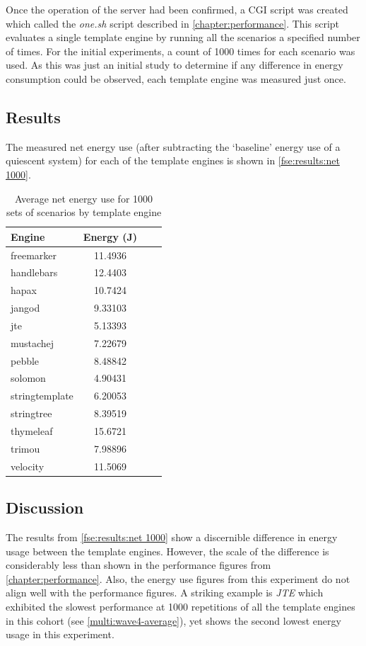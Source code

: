 Once the operation of the server had been confirmed, a CGI script was created which called the \emph{one.sh} script described in \autoref{chapter:performance}. This script evaluates a single template engine by running all the scenarios a specified number of times. For the initial experiments, a count of 1000 times for each scenario was used. As this was just an initial study to determine if any difference in energy consumption could be observed, each template engine was measured just once.

\subsection{Results}
\label{fse results}

The measured net energy use (after subtracting the `baseline' energy use of a quiescent system) for each of the template engines is shown in \autoref{fse:results:net 1000}.

\begin{table}[ht!]
\centering
\begin{tabular}{lccr}
\textbf{Engine} & \textbf{Energy (J)} \\
\hline
freemarker & 11.4936 \\
handlebars & 12.4403 \\
hapax & 10.7424 \\
jangod & 9.33103 \\
jte & 5.13393 \\
mustachej & 7.22679 \\
pebble & 8.48842 \\
solomon & 4.90431 \\
stringtemplate & 6.20053 \\
stringtree & 8.39519 \\
thymeleaf & 15.6721 \\
trimou & 7.98896 \\
velocity & 11.5069 \\
\end{tabular}
\caption{Average net energy use for 1000 sets of scenarios by template engine\label{fse:results:net 1000}}
\end{table}

\subsection{Discussion}
\label{fse discussion}

The results from \autoref{fse:results:net 1000} show a discernible difference in energy usage between the template engines. However, the scale of the difference is considerably less than shown in the performance figures from \autoref{chapter:performance}. Also, the energy use figures from this experiment do not align well with the performance figures. A striking example is \emph{JTE} which exhibited the slowest performance at 1000 repetitions of all the template engines in this cohort (see \autoref{multi:wave4-average}), yet shows the second lowest energy usage in this experiment.

